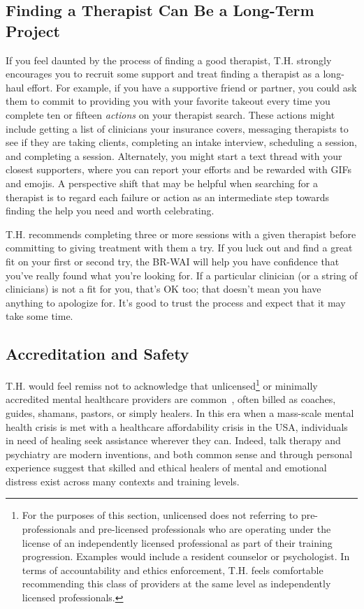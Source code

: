 \documentclass[11pt,oneside]{book}
\let\cite\parencite
\begin{document}
\subsection*{Finding a Therapist Can Be a Long-Term Project}
If you feel daunted by the process of finding a good therapist, T.H. strongly encourages you to recruit some support and treat finding a therapist as a long-haul effort. For example, if you have a supportive friend or partner, you could ask them to commit to providing you with your favorite takeout every time you complete ten or fifteen \textit{actions} on your therapist search. These actions might include getting a list of clinicians your insurance covers, messaging therapists to see if they are taking clients, completing an intake interview, scheduling a session, and completing a session. Alternately, you might start a text thread with your closest supporters, where you can report your efforts and be rewarded with GIFs and emojis. A perspective shift that may be helpful when searching for a therapist is to regard each failure or action as an intermediate step towards finding the help you need and worth celebrating.

T.H. recommends completing three or more sessions with a given therapist before committing to giving treatment with them a try. If you luck out and find a great fit on your first or second try, the BR-WAI will help you have confidence that you've really found what you're looking for. If a particular clinician (or a string of clinicians) is not a fit for you, that's OK too; that doesn't mean you have anything to apologize for. It's good to trust the process and expect that it may take some time.

\subsection*{Accreditation and Safety}
\label{sec:accreditation}
T.H. would feel remiss not to acknowledge that unlicensed\footnote{For the purposes of this section, unlicensed does not referring to pre-professionals and pre-licensed professionals who are operating under the license of an independently licensed professional as part of their training progression. Examples would include a resident counselor or psychologist. In terms of accountability and ethics enforcement, T.H. feels comfortable recommending this class of providers at the same level as independently licensed professionals.} or minimally accredited mental healthcare providers are common~\cite{aboujaoude2020coachingVSTherapy}, often billed as coaches, guides, shamans, pastors, or simply healers. In this era when a mass-scale mental health crisis is met with a healthcare affordability crisis in the USA, individuals in need of healing seek assistance wherever they can. Indeed, talk therapy and psychiatry are modern inventions, and both common sense and through personal experience suggest that skilled and ethical healers of mental and emotional distress exist across many contexts and training levels.
\end{document}
